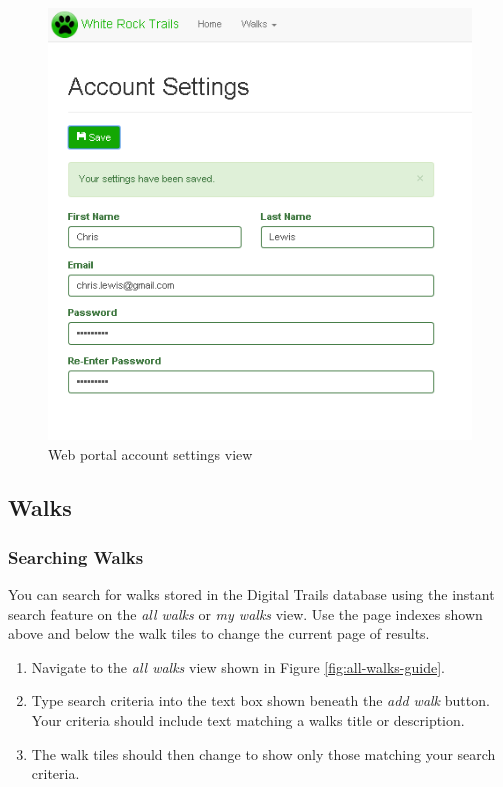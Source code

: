 \documentclass[11pt,a4paper]{report}
\begin{document}
\begin{figure}[h]
\centering
\includegraphics[width=0.7\linewidth]{./img/webportal/user-account}
\caption{Web portal account settings view}
\label{fig:user-account-guide}
\end{figure}

\subsection{Walks}

\subsubsection{Searching Walks}

You can search for walks stored in the Digital Trails database using the instant search feature on the \emph{all walks} or \emph{my walks} view. Use the page indexes shown above and below the walk tiles to change the current page of results.

\begin{enumerate}
\item Navigate to the \emph{all walks} view shown in Figure \ref{fig:all-walks-guide}.
\item Type search criteria into the text box shown beneath the \emph{add walk} button. Your criteria should include text matching a walks title or description.
\item The walk tiles should then change to show only those matching your search criteria.
\end{enumerate}
\end{document}
